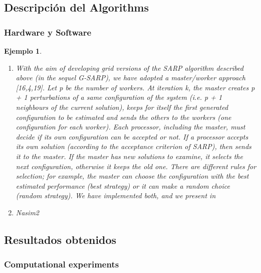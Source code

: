 \documentclass{beamer}
\newtheorem{ejemplo}{Ejemplo}
\begin{document}
\subsection{Descripción del Algorithms }
\begin{frame}
\frametitle{Hardware y Software}

\begin{ejemplo}
  \begin{enumerate}
    \item
      With the aim of developing grid versions of the SARP algorithm described above (in the sequel G-SARP),
we have adopted a master/worker approach [16,4,19].
Let p be the number of workers. At iteration k, the master creates p + 1 perturbations of a same configuration
of the system (i.e. p + 1 neighbours of the current solution), keeps for itself the first generated configuration
to be estimated and sends the others to the workers (one configuration for each worker). Each processor,
including the master, must decide if its own configuration can be accepted or not. If a processor accepts its
own solution (according to the acceptance criterion of SARP), then sends it to the master. If the master has
new solutions to examine, it selects the next configuration, otherwise it keeps the old one. There are different
rules for selection; for example, the master can choose the configuration with the best estimated performance
(best strategy) or it can make a random choice (random strategy). We have implemented both, and we present in 
      \pause

    \item
 Nasim2
  \end{enumerate}
\end{ejemplo}

\end{frame}

\subsection{Resultados obtenidos}
\begin{frame}
\frametitle{Computational experiments}



\end{frame}
\end{document}
